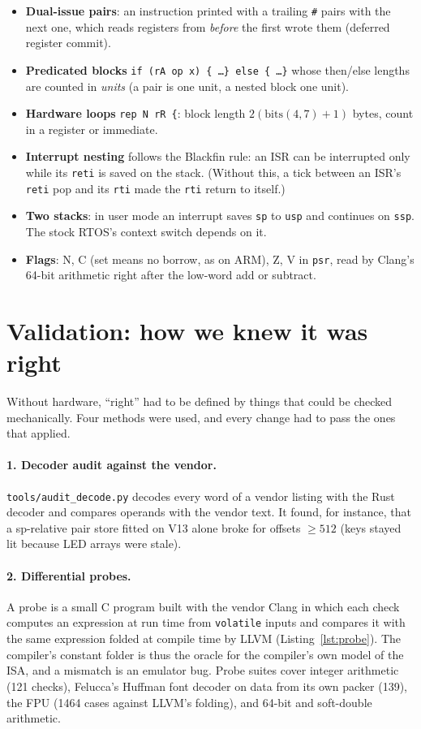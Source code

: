 \documentclass[10pt,a4paper]{article}
\newcommand{\code}[1]{\texttt{#1}}
\begin{document}
\begin{itemize}
\item \textbf{Dual-issue pairs}: an instruction printed with a trailing \code{\#} pairs with the next
  one, which reads registers from \emph{before} the first wrote them (deferred register commit).
\item \textbf{Predicated blocks} \code{if (rA op x) \{ \ldots\} else \{ \ldots\}} whose then/else
  lengths are counted in \emph{units} (a pair is one unit, a nested block one unit).
\item \textbf{Hardware loops} \code{rep N rR \{}: block length $2(\mathrm{bits}(4,7)+1)$ bytes,
  count in a register or immediate.
\item \textbf{Interrupt nesting} follows the Blackfin rule: an ISR can be interrupted only while its
  \code{reti} is saved on the stack. (Without this, a tick between an ISR's \code{reti} pop and its
  \code{rti} made the \code{rti} return to itself.)
\item \textbf{Two stacks}: in user mode an interrupt saves \code{sp} to \code{usp} and continues on
  \code{ssp}. The stock RTOS's context switch depends on it.
\item \textbf{Flags}: N, C (set means no borrow, as on ARM), Z, V in \code{psr}, read by Clang's 64-bit
  arithmetic right after the low-word add or subtract.
\end{itemize}

\section{Validation: how we knew it was right}

Without hardware, ``right'' had to be defined by things that could be checked mechanically. Four
methods were used, and every change had to pass the ones that applied.

\paragraph{1. Decoder audit against the vendor.} \code{tools/audit\_decode.py} decodes every word of a
vendor listing with the Rust decoder and compares operands with the vendor text. It found, for
instance, that a sp-relative pair store fitted on V13 alone broke for offsets $\ge 512$ (keys stayed
lit because LED arrays were stale).

\paragraph{2. Differential probes.} A probe is a small C program built with the vendor Clang in which
each check computes an expression at run time from \code{volatile} inputs and compares it with the
same expression folded at compile time by LLVM (Listing~\ref{lst:probe}). The compiler's constant
folder is thus the oracle for the compiler's own model of the ISA, and a mismatch is an emulator bug.
Probe suites cover integer arithmetic (121 checks), Felucca's Huffman font decoder on data from its
own packer (139), the FPU (1464 cases against LLVM's folding), and 64-bit and soft-double arithmetic.
\end{document}
